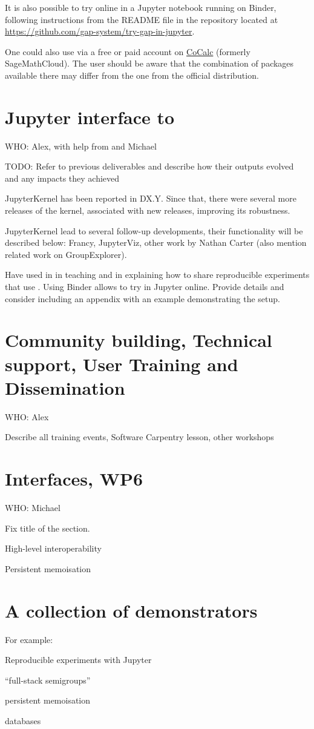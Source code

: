 \documentclass{deliverablereport}
\begin{document}
It is also possible to try \GAP online in a Jupyter notebook running 
on Binder, following instructions from the README file in the repository
located at \url{https://github.com/gap-system/try-gap-in-jupyter}.

One could also use \GAP via a free or paid account
on \href{https://cocalc.com/}{CoCalc} (formerly SageMathCloud).
The user should be aware that the combination of \GAP packages 
available there may differ from the one from the official \GAP distribution.

\section{Jupyter interface to \GAP}

WHO: Alex, with help from and Michael

TODO: Refer to previous deliverables and describe how their outputs
evolved and any impacts they achieved

JupyterKernel has been reported in DX.Y. Since that, there were
several more releases of the kernel, associated with new \GAP
releases, improving its robustness. 

JupyterKernel lead to several follow-up developments, their
functionality will be described below: Francy, JupyterViz,
other work by Nathan Carter (also mention related work on
GroupExplorer).

Have used in in teaching and in explaining how to share 
reproducible experiments that use \GAP. Using Binder
allows to try \GAP in Jupyter online. Provide details
and consider including an appendix with an example 
demonstrating the setup.

\section{Community building, Technical support, User Training and Dissemination}\label{gap-support}

WHO: Alex

Describe all training events, Software Carpentry lesson, other workshops

\section{Interfaces, WP6}

WHO: Michael

Fix title of the section.

High-level interoperability

Persistent memoisation

\section{A collection of demonstrators}\label{demos}

For example:

Reproducible experiments with Jupyter

``full-stack semigroups''

persistent memoisation

databases

\end{document}
